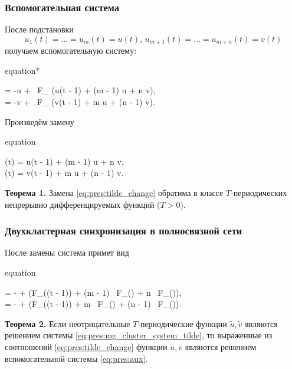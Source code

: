 \begin{frame}
	\frametitle{Вспомогательная система}
	\small
	После подстановки 
	$$u_1(t)=\ldots=u_m(t) = u(t), \, u_{m+1}(t)=\ldots=u_{m+n}(t) = v(t)$$
	получаем вспомогательную систему:
	\begin{empheq}[box=\myeq]{equation*}
		\label{eq:pres:aux}
		\begin{cases}
			 = -\beta u + \alpha \, F_{\gamma} \big(u(t - 1) + \delta (m - 1) u + \delta n v\big),\\
			 = -\beta v + \alpha \, F_{\gamma} \big(v(t - 1) + \delta m u + \delta (n - 1) v\big).
		\end{cases}\tag{AUX2}
	\end{empheq}
	
	Произведём замену 
	\begin{empheq}[box=\myeq]{equation}
	\label{eq:pres:tilde_change}
		\begin{cases}
			(t) = u(t - 1) + \delta (m - 1) u + \delta n v,\\ (t) = v(t - 1) + \delta m u + \delta (n - 1) v.
		\end{cases}
	\end{empheq}
	
	\textbf{Теорема 1.} Замена \eqref{eq:pres:tilde_change} обратима в классе $T$-периодических непрерывно дифференцируемых функций ($T > 0$).
	\normalsize
	
\end{frame}

\begin{frame}
	\frametitle{Двухкластерная синхронизация в полносвязной сети}
	
	После замены система примет вид
	\small
	\begin{empheq}[box=\myeq]{equation}
		\label{eq:pres:mg_cluster_system_tilde}
		\begin{cases}
			 = -\beta {} + \alpha \big(F_{\gamma}((t - 1)) + \delta (m - 1) \, F_{\gamma}() + \delta n \, F_{\gamma}()\big),\\
			 = -\beta {} + \alpha \big(F_{\gamma}((t - 1)) + \delta m \, F_{\gamma}() + \delta (n - 1) \, F_{\gamma}(\tilde{v})\big).
		\end{cases}
	\end{empheq}
	\normalsize
	
	
	\textbf{Теорема 2.} Если неотрицательные $T$-периодические функции $\tilde{u}, $ являются решением системы \eqref{eq:pres:mg_cluster_system_tilde}, то выраженные из соотношений \eqref{eq:pres:tilde_change} функции $u, v$ являются решением вспомогательной системы \eqref{eq:pres:aux}.
\end{frame}

